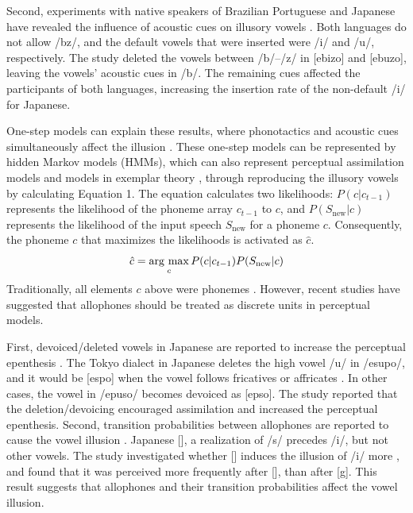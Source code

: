 \documentclass[a4paper,11pt,twocolumn]{article}
\newcommand{\argmax}{\mathop{\rm arg~max}\limits}
\begin{document}
Second, experiments with native speakers of Brazilian Portuguese and Japanese have revealed the influence of acoustic cues on illusory vowels \cite{dupoux2011illusory}. Both languages do not allow /bz/, and the default vowels that were inserted were /i/ and /u/, respectively. The study deleted the vowels between /b/--/z/ in [ebizo] and [ebuzo], leaving the vowels' acoustic cues in /b/. The remaining cues affected the participants of both languages, increasing the insertion rate of the non-default /i/ for Japanese.

One-step models can explain these results, where phonotactics and acoustic cues simultaneously affect the illusion \cite{dupoux2011illusory}. These one-step models can be represented by hidden Markov models (HMMs), which can also represent perceptual assimilation models \cite{best2001discrimination} and models in exemplar theory \cite{lacerda1995perceptual}, through reproducing the illusory vowels \cite{kishiyama2021influence} by calculating Equation 1. The equation calculates two likelihoods: $P(c|c_{t-1})$ represents the likelihood of the phoneme array $c_{t-1}$ to $c$, and $P(S_{\text{new}}|c)$ represents the likelihood of the input speech $S_{\text{new}}$ for a phoneme $c$. Consequently, the phoneme $c$ that maximizes the likelihoods is activated as $\hat{c}$.
\begin{equation} \label{hmm}
    \hat{c} = \argmax_{c} P(c | c_{t-1})P(S_{\text{new}}|c)
\end{equation}
Traditionally, all elements $c$ above were phonemes \cite{wilson2013bayesian}. However, recent studies have suggested that allophones should be treated as discrete units in perceptual models.

First, devoiced/deleted vowels in Japanese are reported to increase the perceptual epenthesis \cite{kilpatrick2018japanese}. The Tokyo dialect in Japanese deletes the high vowel /u/ in /esupo/, and it would be [espo] when the vowel follows fricatives or affricates \cite{fujimoto2003devoice_eng, shaw2018lingual}. In other cases, the vowel in /epuso/ becomes devoiced as [ep\textsubring{\textturnm}so]. The study reported that the deletion/devoicing encouraged assimilation and increased the perceptual epenthesis. Second, transition probabilities between allophones are reported to cause the vowel illusion \cite{kilpatrick2020japanese}. Japanese [\textctc], a realization of /s/ precedes /i/, but not other vowels. The study investigated whether [\textctc{}] induces the illusion of /i/ more \cite{kilpatrick2020japanese}, and found that it was perceived more frequently after [\textctc], than after [g]. This result suggests that allophones and their transition probabilities affect the vowel illusion.
\end{document}

